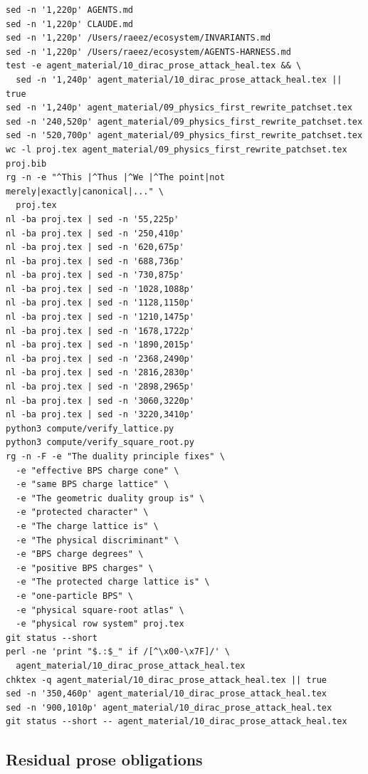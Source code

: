 \begin{verbatim}
sed -n '1,220p' AGENTS.md
sed -n '1,220p' CLAUDE.md
sed -n '1,220p' /Users/raeez/ecosystem/INVARIANTS.md
sed -n '1,220p' /Users/raeez/ecosystem/AGENTS-HARNESS.md
test -e agent_material/10_dirac_prose_attack_heal.tex && \
  sed -n '1,240p' agent_material/10_dirac_prose_attack_heal.tex || true
sed -n '1,240p' agent_material/09_physics_first_rewrite_patchset.tex
sed -n '240,520p' agent_material/09_physics_first_rewrite_patchset.tex
sed -n '520,700p' agent_material/09_physics_first_rewrite_patchset.tex
wc -l proj.tex agent_material/09_physics_first_rewrite_patchset.tex proj.bib
rg -n -e "^This |^Thus |^We |^The point|not merely|exactly|canonical|..." \
  proj.tex
nl -ba proj.tex | sed -n '55,225p'
nl -ba proj.tex | sed -n '250,410p'
nl -ba proj.tex | sed -n '620,675p'
nl -ba proj.tex | sed -n '688,736p'
nl -ba proj.tex | sed -n '730,875p'
nl -ba proj.tex | sed -n '1028,1088p'
nl -ba proj.tex | sed -n '1128,1150p'
nl -ba proj.tex | sed -n '1210,1475p'
nl -ba proj.tex | sed -n '1678,1722p'
nl -ba proj.tex | sed -n '1890,2015p'
nl -ba proj.tex | sed -n '2368,2490p'
nl -ba proj.tex | sed -n '2816,2830p'
nl -ba proj.tex | sed -n '2898,2965p'
nl -ba proj.tex | sed -n '3060,3220p'
nl -ba proj.tex | sed -n '3220,3410p'
python3 compute/verify_lattice.py
python3 compute/verify_square_root.py
rg -n -F -e "The duality principle fixes" \
  -e "effective BPS charge cone" \
  -e "same BPS charge lattice" \
  -e "The geometric duality group is" \
  -e "protected character" \
  -e "The charge lattice is" \
  -e "The physical discriminant" \
  -e "BPS charge degrees" \
  -e "positive BPS charges" \
  -e "The protected charge lattice is" \
  -e "one-particle BPS" \
  -e "physical square-root atlas" \
  -e "physical row system" proj.tex
git status --short
perl -ne 'print "$.:$_" if /[^\x00-\x7F]/' \
  agent_material/10_dirac_prose_attack_heal.tex
chktex -q agent_material/10_dirac_prose_attack_heal.tex || true
sed -n '350,460p' agent_material/10_dirac_prose_attack_heal.tex
sed -n '900,1010p' agent_material/10_dirac_prose_attack_heal.tex
git status --short -- agent_material/10_dirac_prose_attack_heal.tex
\end{verbatim}

\subsection{Residual prose obligations}

